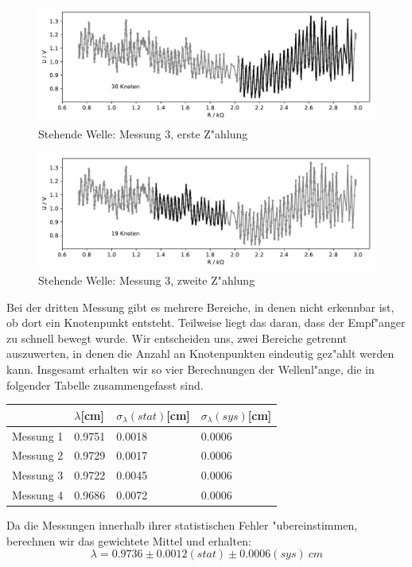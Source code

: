 \documentclass[12pt,a4paper]{article}
\begin{document}
\begin{figure}[H]
	\centering
	\includegraphics[scale=0.8]{Python/stehwel3.pdf}
	\caption{Stehende Welle: Messung 3, erste Z"ahlung}
\end{figure}

\begin{figure}[H]
	\centering
	\includegraphics[scale=0.8]{Python/stehwel4.pdf}
	\caption{Stehende Welle: Messung 3, zweite Z"ahlung}
\end{figure}

Bei der dritten Messung gibt es mehrere Bereiche, in denen nicht erkennbar ist, ob dort ein Knotenpunkt entsteht. Teilweise liegt das daran, dass der Empf"anger zu schnell bewegt wurde. Wir entscheiden uns, zwei Bereiche getrennt auszuwerten, in denen die Anzahl an Knotenpunkten eindeutig gez"ahlt werden kann. Insgesamt erhalten wir so vier Berechnungen der Wellenl"ange, die in folgender Tabelle zusammengefasst sind.
\begin{table}[H]
	\centering
	\begin{tabular}{|l|l|l|l|}
		\hline 
		& $\lambda$[cm]&$\sigma_{\lambda}(stat)$[cm]&$\sigma_{\lambda}(sys)$[cm]\\ 
		\hline 
		Messung 1&0.9751&0.0018&0.0006\\
		\hline
		Messung 2&0.9729&0.0017&0.0006\\
		\hline
		Messung 3&0.9722&0.0045&0.0006\\
		\hline
		Messung 4&0.9686&0.0072&0.0006\\
		\hline
	\end{tabular} 
\end{table}
Da die Messungen innerhalb ihrer statistischen Fehler "ubereinstimmen, berechnen wir das gewichtete Mittel und erhalten:
\begin{equation}
\lambda=0.9736\pm0.0012(stat)\pm0.0006(sys)\ cm
\end{equation}
\end{document}

